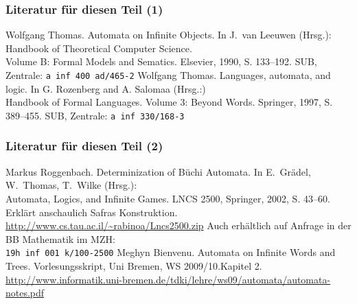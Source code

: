     \begin{frame}
      \frametitle{Literatur für diesen Teil (1)}
      \begin{small}
        \begin{thebibliography}{99}
            Wolfgang Thomas.
            \newblock
            Automata on Infinite Objects. 
            \newblock
            In J.\ van Leeuwen (Hrsg.):\\
            Handbook of Theoretical Computer Science.\\
            Volume B: Formal Models and Sematics.
            \newblock
            Elsevier, 1990, S. 133--192.
            \newblock
            SUB, Zentrale:
            \texttt{a inf 400 ad/465-2}
            Wolfgang Thomas.
            \newblock
            Languages, automata, and logic.
            \newblock
            In G. Rozenberg and A. Salomaa (Hrsg.:)\\
            Handbook of Formal Languages. Volume 3: Beyond Words.
            \newblock
            Springer, 1997, S. 389--455.
            \newblock
            SUB, Zentrale:
            \texttt{a inf 330/168-3}
        \end{thebibliography}
        \par
      \end{small}
      \note{~}
    \end{frame}

    \begin{frame}
      \frametitle{Literatur für diesen Teil (2)}
      \begin{small}
        \begin{thebibliography}{99}
            Markus Roggenbach.
            \newblock
            Determinization of Büchi Automata.
            \newblock
            In E.\ Grädel, W.\ Thomas, T.\ Wilke (Hrsg.):\\
            Automata, Logics, and Infinite Games.
            \newblock
            LNCS 2500, Springer, 2002, S. 43--60.
            \newblock
            Erklärt anschaulich Safras Konstruktion.\\
            \url{http://www.cs.tau.ac.il/~rabinoa/Lncs2500.zip}
            \newblock
            Auch erhältlich auf Anfrage in der BB Mathematik im MZH:\\
            \texttt{19h inf 001 k/100-2500}
            Meghyn Bienvenu.
            \newblock
            Automata on Infinite Words and Trees.
            \newblock
            Vorlesungsskript, Uni Bremen, WS 2009/10.\hfill Kapitel 2.
            \newblock
            \url{http://www.informatik.uni-bremen.de/tdki/lehre/ws09/automata/automata-notes.pdf}
        \end{thebibliography}
        \par
      \end{small}
      \note{~}
    \end{frame}

